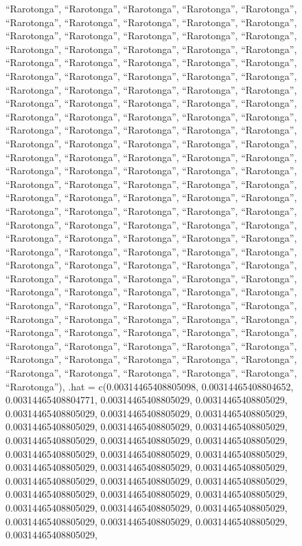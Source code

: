 \documentclass[
  ,man]{apa6}
\begin{document}
``Rarotonga'', ``Rarotonga'', ``Rarotonga'', ``Rarotonga'', ``Rarotonga'', ``Rarotonga'', ``Rarotonga'', ``Rarotonga'', ``Rarotonga'', ``Rarotonga'', ``Rarotonga'', ``Rarotonga'', ``Rarotonga'', ``Rarotonga'', ``Rarotonga'', ``Rarotonga'', ``Rarotonga'', ``Rarotonga'', ``Rarotonga'', ``Rarotonga'', ``Rarotonga'', ``Rarotonga'', ``Rarotonga'', ``Rarotonga'', ``Rarotonga'', ``Rarotonga'', ``Rarotonga'', ``Rarotonga'', ``Rarotonga'', ``Rarotonga'', ``Rarotonga'', ``Rarotonga'', ``Rarotonga'', ``Rarotonga'', ``Rarotonga'', ``Rarotonga'', ``Rarotonga'', ``Rarotonga'', ``Rarotonga'',
``Rarotonga'', ``Rarotonga'', ``Rarotonga'', ``Rarotonga'', ``Rarotonga'', ``Rarotonga'', ``Rarotonga'', ``Rarotonga'', ``Rarotonga'', ``Rarotonga'', ``Rarotonga'', ``Rarotonga'', ``Rarotonga'', ``Rarotonga'', ``Rarotonga'', ``Rarotonga'', ``Rarotonga'', ``Rarotonga'', ``Rarotonga'', ``Rarotonga'', ``Rarotonga'', ``Rarotonga'', ``Rarotonga'', ``Rarotonga'', ``Rarotonga'', ``Rarotonga'', ``Rarotonga'', ``Rarotonga'', ``Rarotonga'', ``Rarotonga'', ``Rarotonga'', ``Rarotonga'', ``Rarotonga'', ``Rarotonga'', ``Rarotonga'', ``Rarotonga'', ``Rarotonga'', ``Rarotonga'', ``Rarotonga'',
``Rarotonga'', ``Rarotonga'', ``Rarotonga'', ``Rarotonga'', ``Rarotonga'', ``Rarotonga'', ``Rarotonga'', ``Rarotonga'', ``Rarotonga'', ``Rarotonga'', ``Rarotonga'', ``Rarotonga'', ``Rarotonga'', ``Rarotonga'', ``Rarotonga'', ``Rarotonga'', ``Rarotonga'', ``Rarotonga'', ``Rarotonga'', ``Rarotonga'', ``Rarotonga'', ``Rarotonga'', ``Rarotonga'', ``Rarotonga'', ``Rarotonga'', ``Rarotonga'', ``Rarotonga'', ``Rarotonga'', ``Rarotonga'', ``Rarotonga'', ``Rarotonga'', ``Rarotonga'', ``Rarotonga'', ``Rarotonga'', ``Rarotonga'', ``Rarotonga'', ``Rarotonga'', ``Rarotonga'', ``Rarotonga'',
``Rarotonga'', ``Rarotonga'', ``Rarotonga'', ``Rarotonga'', ``Rarotonga'', ``Rarotonga'', ``Rarotonga'', ``Rarotonga'', ``Rarotonga'', ``Rarotonga'', ``Rarotonga'', ``Rarotonga'', ``Rarotonga'', ``Rarotonga'', ``Rarotonga'', ``Rarotonga'', ``Rarotonga'', ``Rarotonga'', ``Rarotonga'', ``Rarotonga'', ``Rarotonga'', ``Rarotonga'', ``Rarotonga'', ``Rarotonga''), .hat = c(0.00314465408805098, 0.00314465408804652, 0.00314465408804771, 0.00314465408805029, 0.00314465408805029, 0.00314465408805029, 0.00314465408805029, 0.00314465408805029, 0.00314465408805029,
0.00314465408805029, 0.00314465408805029, 0.00314465408805029, 0.00314465408805029, 0.00314465408805029, 0.00314465408805029, 0.00314465408805029, 0.00314465408805029, 0.00314465408805029, 0.00314465408805029, 0.00314465408805029, 0.00314465408805029, 0.00314465408805029, 0.00314465408805029, 0.00314465408805029, 0.00314465408805029, 0.00314465408805029, 0.00314465408805029, 0.00314465408805029, 0.00314465408805029, 0.00314465408805029, 0.00314465408805029, 0.00314465408805029, 0.00314465408805029,
\end{document}
